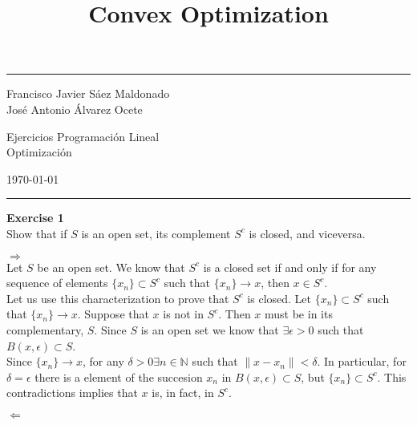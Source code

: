 \documentclass[11pt,table]{article}
\title{Convex Optimization}
\newenvironment{problem}[2][Exercise]
    { \begin{mdframed}[backgroundcolor=gray!20] \textbf{#1 #2} \\}
    {  \end{mdframed}}
\begin{document}
    

\fancyhead[C]{}
\hrule \medskip %
\begin{minipage}{0.295\textwidth}
\raggedright
\footnotesize
Francisco Javier Sáez Maldonado \hfill\\
José Antonio Álvarez Ocete \hfill\\
\end{minipage}
\begin{minipage}{0.4\textwidth}
\centering
\large
Ejercicios Programación Lineal\\
\normalsize
Optimización\\
\end{minipage}
\begin{minipage}{0.295\textwidth}
\raggedleft
\today\hfill\\
\end{minipage}
\medskip\hrule
\bigskip


\begin{problem}{1}
  Show that if \( S \) is an open set, its complement \( S^c \) is closed, and viceversa.
\end{problem}

\(\boxed{\Rightarrow}\)\\

Let \(S\) be an open set. We know that \(S^c\) is a closed set if and only if for any sequence of elements \(\{x_n\} \subset S^c\) such that \(\{x_n\} \longrightarrow x\), then \(x \in S^c\). \\

Let us use this characterization to prove that \(S^c\) is closed. Let \(\{x_n\} \subset S^c\) such that \(\{x_n\} \longrightarrow x\). Suppose that \(x\) is not in \(S^c\). Then \(x\) must be in its complementary, \(S\). Since \(S\) is an open set we know that \(\exists \epsilon > 0\) such that \( B(x, \epsilon) \subset S\). \\

Since \(\{x_n\} \longrightarrow x\), for any \(\delta > 0 \exists n \in \mathbb{N}\) such that \( \parallel x - x_n \parallel < \delta\). In particular, for \(\delta = \epsilon\) there is a element of the succesion \(x_n\) in \( B(x, \epsilon) \subset S\), but \(\{x_n\} \subset S^c\). This contradictions implies that \(x\) is, in fact, in \(S^c\).

\(\boxed{\Leftarrow}\)\\
\end{document}
